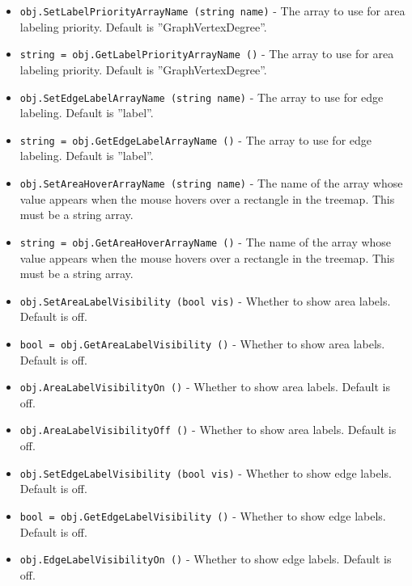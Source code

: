 \begin{itemize}
\item  \verb|obj.SetLabelPriorityArrayName (string name)| -  The array to use for area labeling priority.
 Default is ''GraphVertexDegree''.

\item  \verb|string = obj.GetLabelPriorityArrayName ()| -  The array to use for area labeling priority.
 Default is ''GraphVertexDegree''.

\item  \verb|obj.SetEdgeLabelArrayName (string name)| -  The array to use for edge labeling.  Default is ''label''.

\item  \verb|string = obj.GetEdgeLabelArrayName ()| -  The array to use for edge labeling.  Default is ''label''.

\item  \verb|obj.SetAreaHoverArrayName (string name)| -  The name of the array whose value appears when the mouse hovers
 over a rectangle in the treemap.
 This must be a string array.

\item  \verb|string = obj.GetAreaHoverArrayName ()| -  The name of the array whose value appears when the mouse hovers
 over a rectangle in the treemap.
 This must be a string array.

\item  \verb|obj.SetAreaLabelVisibility (bool vis)| -  Whether to show area labels.  Default is off.

\item  \verb|bool = obj.GetAreaLabelVisibility ()| -  Whether to show area labels.  Default is off.

\item  \verb|obj.AreaLabelVisibilityOn ()| -  Whether to show area labels.  Default is off.

\item  \verb|obj.AreaLabelVisibilityOff ()| -  Whether to show area labels.  Default is off.

\item  \verb|obj.SetEdgeLabelVisibility (bool vis)| -  Whether to show edge labels.  Default is off.

\item  \verb|bool = obj.GetEdgeLabelVisibility ()| -  Whether to show edge labels.  Default is off.

\item  \verb|obj.EdgeLabelVisibilityOn ()| -  Whether to show edge labels.  Default is off.


\end{itemize}
